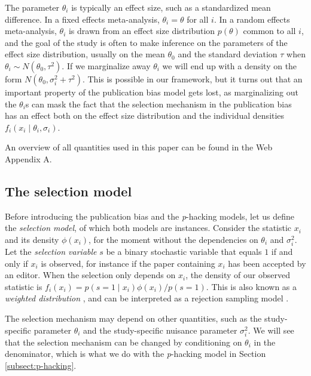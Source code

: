 \documentclass[useAMS,usenatbib,referee]{biom}
\begin{document}
The parameter $\theta_{i}$ is typically an effect size, such as a standardized mean difference. In a fixed effects meta-analysis, $\theta_{i}=\theta$ for all $i$. In a random effects meta-analysis, $\theta_{i}$ is drawn from an effect size distribution $p(\theta)$ common to all $i$, and the goal of the study is often to make inference on the parameters of the effect size distribution, usually on the mean $\theta_{0}$ and the standard deviation $\tau$ when $\theta_i \sim N(\theta_{0},\tau^2)$. If we marginalize away $\theta_{i}$ we will end up with a density on the form $N( \theta_{0},\sigma_{i}^{2}+\tau^{2})$. This is possible in our framework, but it turns out that an important property of the publication bias model gets lost, as marginalizing out the $\theta_{i}$s can mask the fact that the selection mechanism in the publication bias has an effect both on the effect size distribution and the individual densities $f_{i}(x_{i}\mid\theta_i, \sigma_i)$.

An overview of all quantities used in this paper can be found in the Web Appendix A.

\subsection{The selection model}\label{subsec:selectionModel}
Before introducing the publication bias and the \textit{p}-hacking models, let us define the \emph{selection model}, of which both models are instances. Consider the statistic $x_i$ and its density $\phi(x_{i})$, for the moment without the dependencies on $\theta_{i}$ and $\sigma^2_{i}$. Let the \emph{selection variable} $s$ be a binary stochastic variable that equals $1$ if and only if $x_i$ is observed, for instance if the paper containing $x_i$ has been accepted by an editor. When the selection only depends on $x_i$, the density of our observed statistic is $f_{i}(x_{i}) = p(s=1\mid x_i)\phi(x_i)/p(s=1)$. This is also known as a \emph{weighted distribution} \citep[][eq. 3.1]{rao1985weighted}, and can be interpreted as a rejection sampling model \citep{von1951various}.

The selection mechanism may depend on other quantities, such as the study-specific parameter $\theta_i$ and the study-specific nuisance parameter $\sigma^2_{i}$. We will see that the selection mechanism can be changed by conditioning on $\theta_i$ in the denominator, which is what we do with the \textit{p}-hacking model in Section \ref{subsect:p-hacking}. 

\end{document}
